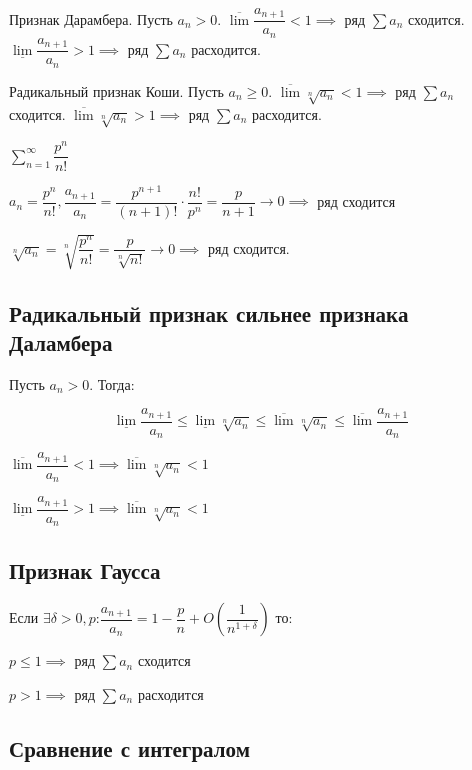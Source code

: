 \begin{theorem}
Признак Дарамбера. Пусть $a_n > 0$. $\overline{\lim} \dfrac{a_{n+1}}{a_n} < 1 \implies $ ряд $\sum a_n$ сходится.
$\underline{\lim} \dfrac{a_{n+1}}{a_n} > 1 \implies $ ряд $\sum a_n$ расходится.
\end{theorem}

\begin{theorem}
Радикальный признак Коши. Пусть $a_n \geq 0$. $\overline{\lim} \sqrt[n]{a_n} < 1 \implies$ ряд $\sum a_n$ сходится. $\overline{\lim} \sqrt[n]{a_n} > 1 \implies$ ряд $\sum a_n$ расходится.
\end{theorem}

\begin{example}
$\sum_{n=1}^{\infty} \dfrac{p^{n}}{n!}$

$a_n = \dfrac{p^n}{n!}, \dfrac{a_{n+1}}{a_n} = \dfrac{p^{n+1}}{(n+1)!} \cdot \dfrac{n!}{p^n} = \dfrac{p}{n + 1} \to 0 \implies $ ряд сходится

$\sqrt[n]{a_n} = \sqrt[n]{\dfrac{p^n}{n!}} = \dfrac{p}{\sqrt[n]{n!}} \to 0 \implies$ ряд сходится.
\end{example}

\subsection{Радикальный признак сильнее признака Даламбера}

Пусть $a_n > 0$. Тогда:

$$ \underline{\lim} \dfrac{a_{n+1}}{a_n} \leq \underline{\lim}{\sqrt[n]{a_n}} \leq \overline{\lim}{\sqrt[n]{a_n}} \leq \overline{\lim}\dfrac{a_{n+1}}{a_n}$$

$\overline{\lim}\dfrac{a_{n+1}}{a_n} < 1 \implies \overline{\lim}{\sqrt[n]{a_n}} < 1$

$\underline{\lim}\dfrac{a_{n+1}}{a_n} > 1 \implies \overline{\lim}{\sqrt[n]{a_n}} < 1$

\subsection{Признак Гаусса}

Если $\exists \delta > 0, p$:$ \dfrac{a_{n+1}}{a_n} = 1 - \dfrac{p}{n} + O\left(\dfrac{1}{n^{1 + \delta}}\right) $
то:

$p \leq 1 \implies$ ряд $\sum a_n$ сходится

$p > 1 \implies$ ряд $\sum a_n$ расходится

\subsection{Сравнение с интегралом}

